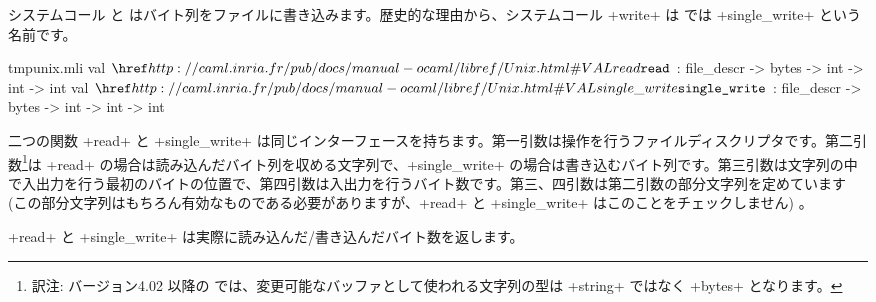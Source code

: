 システムコール  と  はバイト列をファイルに書き込みます。歴史的な理由から、システムコール \ml+write+ は \ocaml では \ml+single_write+ という名前です。
%
\begin{listingcodefile}{tmpunix.mli}
val $\libvalue{Unix}{read}$ : file_descr -> bytes -> int -> int -> int
val $\libvalue{Unix}{single\_write}$ : file_descr -> bytes -> int -> int -> int
\end{listingcodefile}
%
二つの関数 \ml+read+ と \ml+single_write+ は同じインターフェースを持ちます。第一引数は操作を行うファイルディスクリプタです。第二引数\footnote{訳注: バージョン4.02 以降の \ocaml では、変更可能なバッファとして使われる文字列の型は \ml+string+ ではなく \ml+bytes+ となります。}は \ml+read+ の場合は読み込んだバイト列を収める文字列で、\ml+single_write+ の場合は書き込むバイト列です。第三引数は文字列の中で入出力を行う最初のバイトの位置で、第四引数は入出力を行うバイト数です。第三、四引数は第二引数の部分文字列を定めています (この部分文字列はもちろん有効なものである必要がありますが、\ml+read+ と \ml+single_write+ はこのことをチェックしません) 。
%
\begin{myimage}[width="85\%"]
\end{myimage}
%
\ml+read+ と \ml+single_write+ は実際に読み込んだ/書き込んだバイト数を返します。


